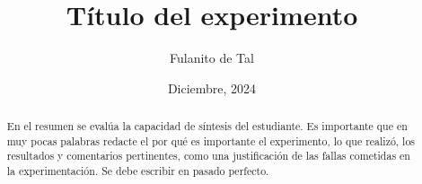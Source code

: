 \documentclass[aps, prd, twocolumn, nofootinbib]{revtex4-1}
\begin{document}
\title{Título del experimento}

\author{Fulanito de Tal}


\date{Diciembre, 2024}

\begin{abstract}
\noindent En el resumen se evalúa la capacidad de síntesis del estudiante. Es importante que en muy pocas palabras redacte el por qué es importante el experimento, lo que realizó, los resultados y comentarios pertinentes, como una justificación de las fallas cometidas en la experimentación. Se debe escribir en pasado perfecto.
\end{abstract} 

\maketitle

















\appendix




\end{document}
